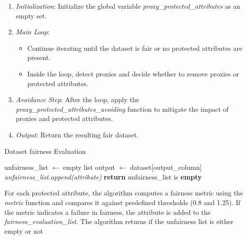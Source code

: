 \begin{enumerate}

    \item \emph{Initialization}: Initialize the global variable \textit{proxy\_protected\_attributes} as an empty set.

    \item \emph{Main Loop}:

        \begin{itemize}

            \item Continue iterating until the dataset is fair or no protected attributes are present.

            \item Inside the loop, detect proxies and decide whether to remove proxies or protected attributes.

        \end{itemize}

    \item \emph{Avoidance Step}: After the loop, apply the \textit{proxy\_protected\_attributes\_avoiding} function to mitigate the impact of proxies and protected attributes.
    
    \item \emph{Output}: Return the resulting fair dataset.

\end{enumerate}

\begin{algorithm}[H]
    \caption{Dataset fairness Evaluation}
    \label{alg:fairness_evaluation}
    \begin{algorithmic}[1]
        \State unfairness\_list $\gets$ empty list\;
        \State output $\gets$ dataset[output\_column]\;
                \State \textit{unfairness\_list.append(attribute)}\;
            \EndIf
        \EndFor
        \State \textbf{return} unfairness\_list is \textbf{empty}
    \end{algorithmic}
\end{algorithm}

For each protected attribute, the algorithm computes a fairness metric using the \textit{metric} function and compares it against predefined thresholds (0.8 and 1.25). If the metric indicates a failure in fairness, the attribute is added to the \textit{fairness\_evaluation\_list}. The algorithm returns if the unfairness list is either empty or not


